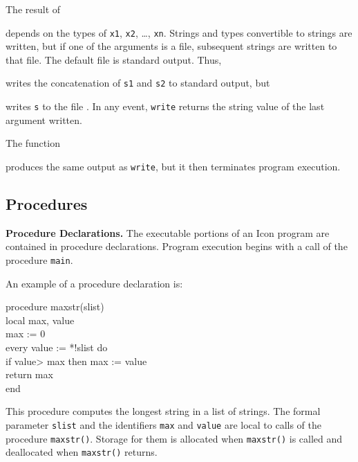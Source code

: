 The result of


\noindent depends on the types of \texttt{x1}, \texttt{x2}, \ldots,
\texttt{xn}. Strings and types convertible to strings are written, but if
one of the arguments is a file, subsequent strings are written to that
file. The default file is standard output. Thus,


\noindent
writes the concatenation of \texttt{s1} and \texttt{s2} to standard output, but


\noindent
writes \texttt{s} to the file . In any event, \texttt{write} returns
the string value of the last argument written.

The function


\noindent
produces the same output as \texttt{write}, but it then terminates program execution.


\subsection{Procedures}

\textbf{Procedure Declarations.} The executable portions of an Icon
program are contained in procedure declarations.  Program execution
begins with a call of the procedure \texttt{main}.

An example of a procedure declaration is:

\begin{iconcode}
\>procedure maxstr(slist)\\
\>\>local max, value\\
\>\>max := 0\\
\>\>every value := *!slist do\\
\>\>\>if value> max then max := value\\
\>\>return max\\
\>end
\end{iconcode}

\noindent This procedure computes the longest string in a list of strings.
The formal parameter \texttt{slist} and the identifiers \texttt{max} and
\texttt{value} are local to calls of the procedure \texttt{maxstr()}.
Storage for them is allocated when \texttt{maxstr()} is called and
deallocated when \texttt{maxstr()} returns.

